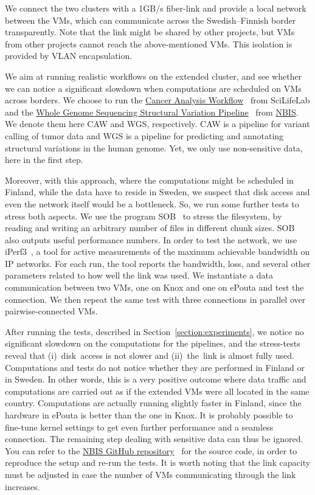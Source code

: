 We connect the two clusters with a 1GB/s fiber-link and provide a
local network between the VMs, which can communicate across the Swedish--Finnish border
transparently.
%
Note that the link might be shared by other projects, but VMs from
other projects cannot reach the above-mentioned VMs.
%
This isolation is provided by VLAN encapsulation.


We aim at running realistic workflows on the extended cluster, and see
whether we can notice a significant slowdown when computations are
scheduled on VMs across borders.
%
We choose to run the \href{https://github.com/SciLifeLab/CAW}{Cancer
  Analysis Workflow}~\cite{caw} from SciLifeLab and the
\href{https://github.com/NBISweden/wgs-structvar}{Whole Genome
  Sequencing Structural Variation Pipeline}~\cite{caw} from
\href{http://www.nbis.se}{NBIS}.
%
We denote them here CAW and WGS, respectively.
%
CAW is a pipeline for variant calling of tumor data and WGS is a
pipeline for predicting and annotating structural variations in the
human genome.
%
Yet, we only use non-sensitive data, here in the first step.

Moreover, with this approach, where the computations might be scheduled
in Finland, while the data have to reside in Sweden, we suspect that
disk access and even the network itself would be a bottleneck. So, we
run some further tests to stress both aspects.
%
We use the program SOB~\cite{sob} to stress the filesystem, by reading
and writing an arbitrary number of files in different chunk sizes.
%
SOB also outputs useful performance numbers.
%
In order to test the network, we use iPerf3~\cite{iperf}, a tool for
active measurements of the maximum achievable bandwidth on IP
networks.
%
For each run, the tool reports the bandwidth, loss, and several other
parameters related to how well the link was used.
%
We instantiate a data communication between two VMs, one on Knox and
one on ePouta and test the connection.
%
We then repeat the same test with three connections in parallel over
pairwise-connected VMs.


After running the tests, described in
Section~\ref{section:experiments}, we notice no significant slowdown
on the computations for the pipelines, and the stress-tests reveal
that (i)~disk~access is not slower and (ii)~the~link is almost fully
used.
%
Computations and tests do not notice whether they are performed in
Finland or in Sweden.
%
In other words, this is a very positive outcome where data traffic and
computations are carried out as if the extended VMs were all located
in the same country.
%
Computations are actually running slightly faster in Finland, since
the hardware in ePouta is better than the one in Knox.
%
It is probably possible to fine-tune kernel settings
to get even further performance and a seamless connection.
%
The remaining step dealing with sensitive data can thus be ignored.
%
You can refer to the
\href{https://github.com/NBISweden/Knox-ePouta}{NBIS GitHub
  repository}~\cite{nbis-knox-epouta} for the source code, in order to
reproduce the setup and re-run the tests.
%
It is worth noting that the link capacity must be adjusted in case the
number of VMs communicating through the link increases.
